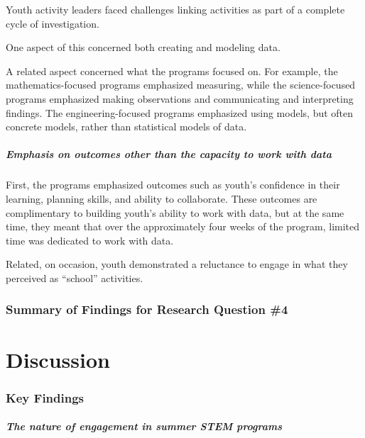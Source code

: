 \documentclass[]{msu-thesis}
\let\oldparagraph\paragraph
\renewcommand{\paragraph}[1]{\oldparagraph{#1}\mbox{}}
\theoremstyle{definition}
\theoremstyle{definition}
\theoremstyle{definition}
\theoremstyle{remark}
\begin{document}
Youth activity leaders faced challenges linking activities as part of a
complete cycle of investigation.

One aspect of this concerned both creating and modeling data.

A related aspect concerned what the programs focused on. For example,
the mathematics-focused programs emphasized measuring, while the
science-focused programs emphasized making observations and
communicating and interpreting findings. The engineering-focused
programs emphasized using models, but often concrete models, rather than
statistical models of data.

\paragraph{Emphasis on outcomes other than the capacity to work with
data}\label{emphasis-on-outcomes-other-than-the-capacity-to-work-with-data}

First, the programs emphasized outcomes such as youth's confidence in
their learning, planning skills, and ability to collaborate. These
outcomes are complimentary to building youth's ability to work with
data, but at the same time, they meant that over the approximately four
weeks of the program, limited time was dedicated to work with data.

Related, on occasion, youth demonstrated a reluctance to engage in what
they perceived as ``school'' activities.

\subsection{Summary of Findings for Research Question
\#4}\label{summary-of-findings-for-research-question-4}

\chapter{Discussion}\label{discussion}

\subsection{Key Findings}\label{key-findings}

\paragraph{The nature of engagement in summer STEM
programs}\label{the-nature-of-engagement-in-summer-stem-programs}
\end{document}
